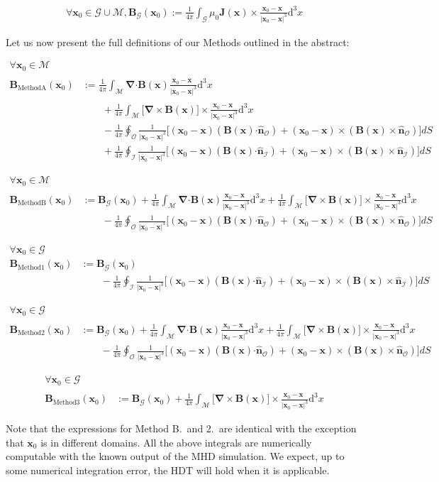\documentclass{article}
\newcommand\B{\mathbf{B}}
\newcommand\J{\mathbf{J}}
\newcommand\x{\mathbf{x}}
\newcommand\M{\mathcal{M}}
\newcommand\G{\mathcal{G}}
\newcommand\I{\mathcal{I}}
\newcommand\Out{\mathcal{O}}
\newcommand\GcupM{\G \cup \M}
\newcommand\ifpi{\frac{1}{4\pi}}
\newcommand\dive[1]{\boldsymbol{\nabla} \boldsymbol{\cdot} #1}
\newcommand\curl[1]{\boldsymbol{\nabla} \times #1}
\newcommand\normal[1]{\mathbf{\hat{n}}_{#1}}
\newcommand\dV{\mathrm{d}^3x}
\newcommand\xoverx{\frac{\phantom{|} \x_0-\x \phantom{|^3}}{| \x_0-\x |^3}}
\newcommand\surf[2]{\frac{1}{|\x_0-\x|^3} \Big[(\x_0-\x) (#2 \boldsymbol{\cdot} #1) + (\x_0-\x)\times (#2 \times #1) \Big]}
\newcommand\coulombInt[1]{\ifpi \int_{#1} \dive{\B}(\x) \xoverx \dV}
\newcommand\biotsavInt[1]{\ifpi \int_{#1} \big[ \curl{\B}(\x) \big] \times \xoverx \dV}
\newcommand\biotsavIntJ[1]{\ifpi \int_{#1} \mu_0 \J(\x) \times \xoverx \dV}
\newcommand\surfInt[1]     {\ifpi \oint_{#1} \surf{\normal{#1}}{\B(\x)} dS}
\begin{document}
\begin{align}
  \forall \x_0 \in \GcupM, \B_{\G}(\x_0) := \biotsavIntJ{\G}
\end{align}

Let us now present the full definitions of our Methods outlined in the abstract:

\begin{align}
\forall \mathbf{x}_0 \in \M \\
\B_{\text{MethodA}}(\x_0) &:= \coulombInt{\mathcal{M}} \nonumber \\
            &\qquad + \biotsavInt{\mathcal{M}} \nonumber \\
            &\qquad - \surfInt{\mathcal{O}}  \nonumber \\
            &\qquad + \surfInt{\mathcal{I}}  \nonumber
\end{align}

\begin{align}
\forall \x_0 \in \M \\
  \B_{\text{MethodB}}(\x_0)
        &:= \B_{\G}(\x_0)
          + \coulombInt{\M}
          + \biotsavInt{\M} \nonumber \\
          &\qquad - \surfInt{\Out} \nonumber
\end{align}

\begin{align}
\forall \x_0 \in \G \\
  \B_{\text{Method1}}(\x_0) &:= \B_{\G}(\x_0) \nonumber \\
            &\qquad - \surfInt{\I}  \nonumber
\end{align}

\begin{align}
\forall \x_0 \in \G \\
  \B_{\text{Method2}}(\x_0)
        &:= \B_{\G}(\x_0)
          + \coulombInt{\M}
          + \biotsavInt{\M} \nonumber \\
          &\qquad - \surfInt{\Out} \nonumber
\end{align}

\begin{align}
\forall \x_0 \in \G \\
  \B_{\text{Method3}}(\x_0)
        &:= \B_{\G}(\x_0)
          + \biotsavInt{\M} \nonumber
\end{align}

Note that the expressions for Method B.~and 2.~are identical with the exception that $\x_0$ is in different domains.
All the above integrals are numerically computable with the known output of the MHD simulation.
We expect, up to some numerical integration error, the HDT will hold when it is applicable.
\end{document}
